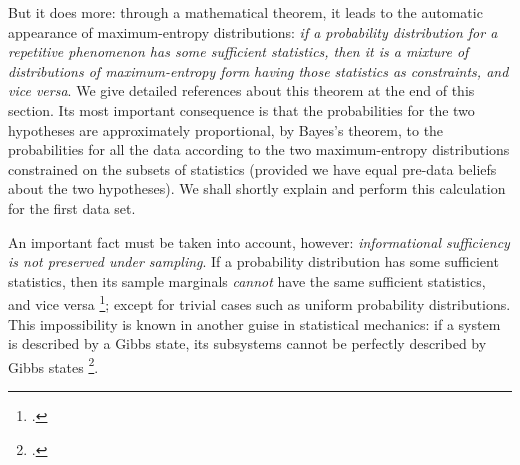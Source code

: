 \documentclass[\ifafour a4paper,12pt,\else a5paper,10pt,\fi%
onecolumn,oneside,article,%
british%
]{memoir}
\theoremstyle{remark}
\theoremstyle{innote}
\newcommand*{\citep}{\footcites}
\renewcommand*{\|}{\nonscript\,\vert\nonscript\;\mathopen{}}
\newcommand*{\sect}{\S}%
\newcommand*{\eg}{{e.g.}}
\begin{document}
But it does more: through a mathematical theorem, it leads to the automatic
appearance of maximum-entropy distributions: \emph{if a probability
  distribution for a repetitive phenomenon has some sufficient statistics,
  then it is a mixture of distributions of maximum-entropy form having
  those statistics as constraints, and vice versa}. We give detailed
references about this theorem at the end of this section.
Its most important consequence is that the probabilities for the two
hypotheses are approximately proportional, by Bayes's theorem, to the
probabilities for all the data according to the two maximum-entropy
distributions constrained on the subsets of statistics (provided we have
equal pre-data beliefs about the two hypotheses). We shall shortly explain
and perform this calculation for the first data set.


\medskip

An important fact must be taken into account, however: \emph{informational
  sufficiency is not preserved under sampling}. If a probability
distribution has some sufficient statistics, then its sample marginals
\emph{cannot} have the same sufficient statistics, and vice versa
\citep[\sect~3.1]{portamanaetal2015}; except for trivial cases such as
uniform probability distributions. %
This impossibility is known in another guise in statistical mechanics: if a
system is described by a Gibbs state, its subsystems cannot be perfectly
described by Gibbs states \citep[\eg][and references
therein]{maesetal1999}. %
\end{document}
